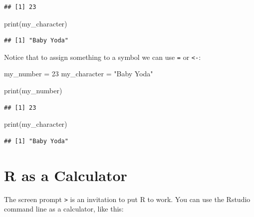 \documentclass[
]{book}
\newenvironment{Shaded}{\begin{snugshade}}{\end{snugshade}}
\newcommand{\DecValTok}[1]{\textcolor[rgb]{0.00,0.00,0.81}{#1}}
\newcommand{\FunctionTok}[1]{\textcolor[rgb]{0.00,0.00,0.00}{#1}}
\newcommand{\NormalTok}[1]{#1}
\newcommand{\OtherTok}[1]{\textcolor[rgb]{0.56,0.35,0.01}{#1}}
\newcommand{\StringTok}[1]{\textcolor[rgb]{0.31,0.60,0.02}{#1}}
\theoremstyle{definition}
\theoremstyle{definition}
\theoremstyle{definition}
\theoremstyle{definition}
\theoremstyle{remark}
\begin{document}
\begin{verbatim}
## [1] 23
\end{verbatim}

\begin{Shaded}
\begin{Highlighting}[]
\FunctionTok{print}\NormalTok{(my\_character)}
\end{Highlighting}
\end{Shaded}

\begin{verbatim}
## [1] "Baby Yoda"
\end{verbatim}

Notice that to assign something to a symbol we can use \texttt{=} or \texttt{\textless{}-}:

\begin{Shaded}
\begin{Highlighting}[]
\NormalTok{my\_number }\OtherTok{=} \DecValTok{23}
\NormalTok{my\_character }\OtherTok{=} \StringTok{"Baby Yoda"}
\end{Highlighting}
\end{Shaded}

\begin{Shaded}
\begin{Highlighting}[]
\FunctionTok{print}\NormalTok{(my\_number)}
\end{Highlighting}
\end{Shaded}

\begin{verbatim}
## [1] 23
\end{verbatim}

\begin{Shaded}
\begin{Highlighting}[]
\FunctionTok{print}\NormalTok{(my\_character)}
\end{Highlighting}
\end{Shaded}

\begin{verbatim}
## [1] "Baby Yoda"
\end{verbatim}

\hypertarget{r-as-a-calculator}{%
\section{R as a Calculator}\label{r-as-a-calculator}}

The screen prompt \texttt{\textgreater{}} is an invitation to put R to work. You can use the Rstudio command line as a calculator, like this:
\end{document}
